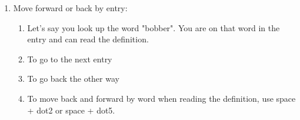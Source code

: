 \documentclass[10pt,letterpaper,twoside]{report}
\begin{document}
{{{\begin{enumerate}
\begin{enumerate}
		      \item Open your document.
		      \item Place the cursor on the word you want to look up.
		      \item Press space + o.
		      \item Press letter l for "look up".
		      \item Press d for dictionary.
		      \item Notice the word your cursor was on in the document is already displayed after the "word to look up" cue.
		      \item Press enter to look up the word.
		      \item Use dictionary commands to read.
	      \end{enumerate}
	\item Move forward or back by entry:
	      \begin{enumerate}
		      \item Let's say you look up the word "bobber". You are on that word in the entry and can read the definition.
		      \item To go to the next entry 
		      \item To go back the other way 
		      \item To move back and forward by word when reading the definition, use space + dot2 or space + dot5.
	      \end{enumerate}
\end{enumerate}

}}}
\end{document}
